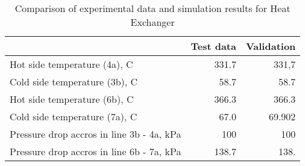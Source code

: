 \begin{table}
\label{tab:Comparison}
\caption{Comparison of experimental data and simulation results for Heat Exchanger}
\begin{center}
\begin{tabulary}{0.9\textwidth}{LRR}
\toprule
& Test data \cite{Iverson_2013}  & Validation \\
\midrule
Hot side temperature (4a), C & 331.7 & 331,7 \\
Cold side temperature (3b), C & 58.7 & 58.7 \\
Hot side temperature (6b), C & 366.3 & 366.3 \\
Cold side temperature (7a), C & 67.0 & 69.902 \\
Pressure drop accros in line 3b - 4a, kPa & 100 & 100 \\
Pressure drop accros in line 6b - 7a, kPa & 138.7 & 138. \\
\bottomrule
\end{tabulary}
\end{center}
\end{table}